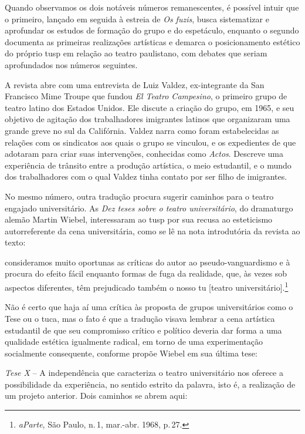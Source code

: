 Quando observamos os dois notáveis números remanescentes, é possível
intuir que o primeiro, lançado em seguida à estreia de {\it Os fuzis},
busca sistematizar e aprofundar os estudos de formação do grupo e do
espetáculo, enquanto o segundo documenta as primeiras realizações
artísticas e demarca o posicionamento estético do próprio {\sc tusp} em
relação ao teatro paulistano, com debates que seriam aprofundados nos
números seguintes.

A revista abre com uma entrevista de Luiz Valdez, ex-integrante da San
Francisco Mime Troupe que fundou {\it El Teatro Campesino}, o primeiro
grupo de teatro latino dos Estados Unidos. Ele discute a criação do
grupo, em 1965, e seu objetivo de agitação dos trabalhadores imigrantes
latinos que organizaram uma grande greve no sul da Califórnia. Valdez
narra como foram estabelecidas as relações com os sindicatos aos quais o
grupo se vinculou, e os expedientes de que adotaram para criar suas
intervenções, conhecidas como {\it Actos}. Descreve uma experiência de
trânsito entre a produção artística, o meio estudantil, e o mundo dos
trabalhadores com o qual Valdez tinha contato por ser filho de
imigrantes.

No mesmo número, outra tradução procura sugerir caminhos para o teatro
engajado universitário. As {\it Dez teses sobre o teatro universitário},
do dramaturgo alemão Martin Wiebel, interessaram ao {\sc tusp} por sua recusa
ao esteticismo autorreferente da cena universitária, como se lê na nota
introdutória da revista ao texto:

\startblockquote
consideramos muito oportunas as críticas do autor ao pseudo-vanguardismo
e à procura do efeito fácil enquanto formas de fuga da realidade, que,
às vezes sob aspectos diferentes, têm prejudicado também o nosso {\sc tu}
{[}teatro universitário{]}.\footnote{{\it aParte}, São Paulo, n.\,1,
  mar.-abr. 1968, p.\,27.}
\stopblockquote

Não é certo que haja aí uma crítica às proposta de grupos universitários
como o Tese ou o {\sc tuca}, mas o fato é que a tradução visava lembrar a cena
artística estudantil de que seu compromisso crítico e político deveria
dar forma a uma qualidade estética igualmente radical, em torno de uma
experimentação socialmente consequente, conforme propõe Wiebel em sua
última tese:

\startblockquote
{\it Tese X} -- A independência que caracteriza o teatro universitário
nos oferece a possibilidade da experiência, no sentido estrito da
palavra, isto é, a realização de um projeto anterior. Dois caminhos se
abrem aqui:

